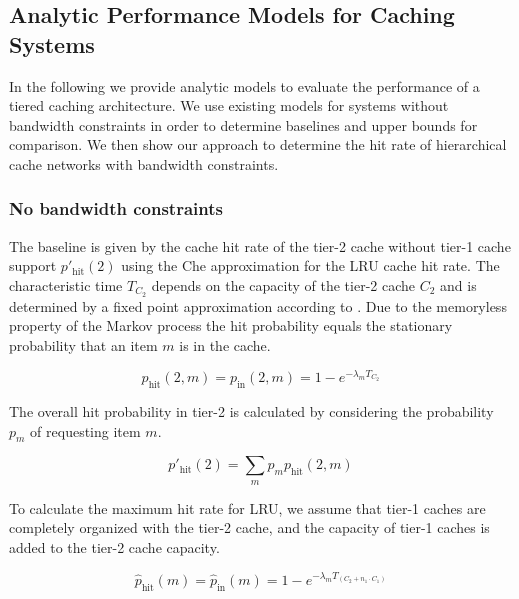 \subsection{Analytic Performance Models for Caching Systems}

In the following we provide analytic models to evaluate the performance of a tiered caching architecture.
We use existing models for systems without bandwidth constraints in order to determine baselines and upper bounds for comparison.
We then show our approach to determine the hit rate of hierarchical cache networks with bandwidth constraints.

\subsubsection{No bandwidth constraints}

The baseline is given by the cache hit rate of the tier-2 cache without tier-1 cache support $p'_\text{hit}(2)$ using the Che approximation for the LRU cache hit rate. The characteristic time $T_{C_2}$ depends on the capacity of the tier-2 cache $C_2$ and is determined by a fixed point approximation according to \cite{che2002hierarchical}.
Due to the memoryless property of the Markov process the hit probability equals the stationary probability that an item $m$ is in the cache.

\begin{equation}
p_\text{hit}(2,m)=p_\text{in}(2,m)=1-e^{-\lambda_{m}T_{C_2}}
\end{equation}

The overall hit probability in tier-2 is calculated by considering the probability $p_m$ of requesting item $m$.

\begin{equation}
p'_\text{hit}(2)=\sum_m p_m p_\text{hit}(2,m)
\end{equation}

To calculate the maximum hit rate for LRU, we assume that tier-1 caches are completely organized with the tier-2 cache, and the capacity of tier-1 caches is added to the tier-2 cache capacity.

\begin{equation}
\hat p_\text{hit}(m)=\hat p_\text{in}(m)=1-e^{-\lambda_{m}T_{(C_2+n_1\cdot C_{1})}}
\end{equation}

